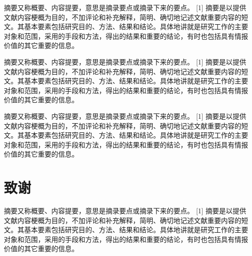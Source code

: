 \documentclass[12pt,oneside,a4paper,fleqn]{ctexart}
\begin{document}
\begin{spacing}{1.25}
摘要又称概要、内容提要，意思是摘录要点或摘录下来的要点。 [1]  摘要是以提供文献内容梗概为目的，不加评论和补充解释，简明、确切地记述文献重要内容的短文。其基本要素包括研究目的、方法、结果和结论。具体地讲就是研究工作的主要对象和范围，采用的手段和方法，得出的结果和重要的结论，有时也包括具有情报价值的其它重要的信息。

摘要又称概要、内容提要，意思是摘录要点或摘录下来的要点。 [1]  摘要是以提供文献内容梗概为目的，不加评论和补充解释，简明、确切地记述文献重要内容的短文。其基本要素包括研究目的、方法、结果和结论。具体地讲就是研究工作的主要对象和范围，采用的手段和方法，得出的结果和重要的结论，有时也包括具有情报价值的其它重要的信息。

摘要又称概要、内容提要，意思是摘录要点或摘录下来的要点。 [1]  摘要是以提供文献内容梗概为目的，不加评论和补充解释，简明、确切地记述文献重要内容的短文。其基本要素包括研究目的、方法、结果和结论。具体地讲就是研究工作的主要对象和范围，采用的手段和方法，得出的结果和重要的结论，有时也包括具有情报价值的其它重要的信息。
\end{spacing}\vspace{0.5em} \section*{\heiti 致谢} \vspace{0.5em}\begin{spacing}{1.25}
摘要又称概要、内容提要，意思是摘录要点或摘录下来的要点。 [1]  摘要是以提供文献内容梗概为目的，不加评论和补充解释，简明、确切地记述文献重要内容的短文。其基本要素包括研究目的、方法、结果和结论。具体地讲就是研究工作的主要对象和范围，采用的手段和方法，得出的结果和重要的结论，有时也包括具有情报价值的其它重要的信息。
\end{spacing}
\end{document}
